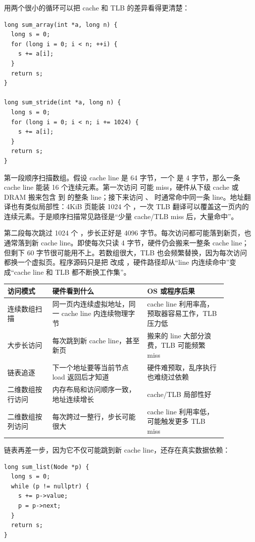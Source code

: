 用两个很小的循环可以把 cache 和 TLB 的差异看得更清楚：

\begin{lstlisting}
long sum_array(int *a, long n) {
  long s = 0;
  for (long i = 0; i < n; ++i) {
    s += a[i];
  }
  return s;
}

long sum_stride(int *a, long n) {
  long s = 0;
  for (long i = 0; i < n; i += 1024) {
    s += a[i];
  }
  return s;
}
\end{lstlisting}

第一段顺序扫描数组。假设 cache line 是 64 字节，一个  是 4 字节，那么一条 cache line 能装 16 个连续元素。第一次访问  可能 miss，硬件从下级 cache 或 DRAM 搬来包含  到  的整条 line；接下来访问 、 时通常命中同一条 line。地址翻译也有类似局部性：4KiB 页能装 1024 个 ，一次 TLB 翻译可以覆盖这一页内的连续元素。于是顺序扫描常见路径是“少量 cache/TLB miss 后，大量命中”。

第二段每次跳过 1024 个 ，步长正好是 4096 字节。每次访问都可能落到新页，也通常落到新 cache line。即使每次只读 4 字节，硬件仍会搬来一整条 cache line；但剩下 60 字节很可能用不上。若数组很大，TLB 也会频繁替换，因为每次访问都换一个虚拟页。程序源码只是把  改成 ，硬件路径却从“line 内连续命中”变成“cache line 和 TLB 都不断换工作集”。

\begin{longtable}{p{0.18\linewidth}p{0.38\linewidth}p{0.32\linewidth}}
\toprule
访问模式 & 硬件看到什么 & OS 或程序后果 \\
\midrule
连续数组扫描 & 同一页内连续虚拟地址，同一 cache line 内连续物理字节 & cache line 利用率高，预取器容易工作，TLB 压力低 \\
大步长访问 & 每次跳到新 cache line，甚至新页 & 搬来的 line 大部分浪费，TLB 可能频繁 miss \\
链表追逐 & 下一个地址要等当前节点 load 返回后才知道 & 硬件难预取，乱序执行也难绕过依赖 \\
二维数组按行访问 & 内存布局和访问顺序一致，地址连续增长 & cache/TLB 局部性好 \\
二维数组按列访问 & 每次跨过一整行，步长可能很大 & cache line 利用率低，可能触发更多 TLB miss \\
\bottomrule
\end{longtable}

链表再差一步，因为它不仅可能跳到新 cache line，还存在真实数据依赖：

\begin{lstlisting}
long sum_list(Node *p) {
  long s = 0;
  while (p != nullptr) {
    s += p->value;
    p = p->next;
  }
  return s;
}
\end{lstlisting}

